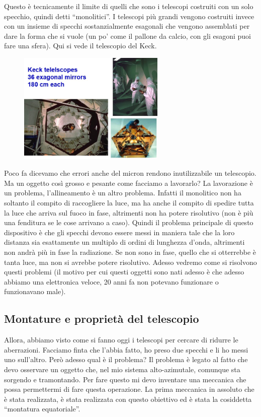 \documentclass[a4paper,11pt]{article}
\begin{document}
Questo è tecnicamente il limite di quelli che sono i telescopi costruiti con un solo specchio, quindi detti “monolitici”. I telescopi più grandi vengono costruiti invece con un insieme di specchi sostanzialmente esagonali che vengono assemblati per dare la forma che si vuole (un po’ come il pallone da calcio, con gli esagoni puoi fare una sfera). Qui si vede il telescopio del Keck.

\begin{figure}[h!!]
        \centering
        \includegraphics[width=7cm]{7.jpg}
        \label{}
    \end{figure}

Poco fa dicevamo che errori anche del micron rendono inutilizzabile un telescopio. Ma un oggetto così grosso e pesante come facciamo a lavorarlo? La lavorazione è un problema, l’allineamento è un altro problema. Infatti il monolitico non ha soltanto il compito di raccogliere la luce, ma ha anche il compito di spedire tutta la luce che arriva sul fuoco in fase, altrimenti non ha potere risolutivo (non è più una fenditura se le cose arrivano a caso). Quindi il problema principale di questo dispositivo è che gli specchi devono essere messi in maniera tale che la loro distanza sia esattamente un multiplo di ordini di lunghezza d'onda, altrimenti non andrà più in fase la radiazione. Se non sono in fase, quello che si otterrebbe è tanta luce, ma non si avrebbe potere risolutivo. Adesso vedremo come si risolvono questi problemi (il motivo per cui questi oggetti sono nati adesso è che adesso abbiamo una elettronica veloce, 20 anni fa non potevano funzionare o funzionavano male).

\subsection{Montature e proprietà del telescopio}
Allora, abbiamo visto come si fanno oggi i telescopi per cercare di ridurre le aberrazioni.  Facciamo finta che l’abbia fatto, ho preso due specchi e li ho messi uno sull’altro. Però adesso qual è il problema? Il problema è legato al fatto che devo osservare un oggetto che, nel mio sistema alto-azimutale, comunque sta sorgendo e tramontando. Per fare questo mi devo inventare una meccanica che possa permettermi di fare questa operazione. La prima meccanica in assoluto che è stata realizzata, è stata realizzata con questo obiettivo ed è stata la cosiddetta “montatura equatoriale”.
\end{document}

